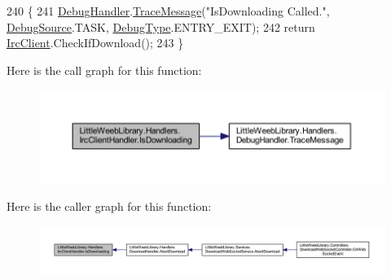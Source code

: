 \begin{DoxyCode}
240         \{
241             \mbox{\hyperlink{class_little_weeb_library_1_1_handlers_1_1_irc_client_handler_ab50ece494948d25db1839f4d6eab038f}{DebugHandler}}.\mbox{\hyperlink{interface_little_weeb_library_1_1_handlers_1_1_i_debug_handler_a2e405bc3492e683cd3702fae125221bc}{TraceMessage}}(\textcolor{stringliteral}{"IsDownloading Called."}, 
      \mbox{\hyperlink{namespace_little_weeb_library_1_1_handlers_a2a6ca0775121c9c503d58aa254d292be}{DebugSource}}.TASK, \mbox{\hyperlink{namespace_little_weeb_library_1_1_handlers_ab66019ed40462876ec4e61bb3ccb0a62}{DebugType}}.ENTRY\_EXIT);
242             \textcolor{keywordflow}{return} \mbox{\hyperlink{class_little_weeb_library_1_1_handlers_1_1_irc_client_handler_a1c78638ea8025b27bb3e604f432ce325}{IrcClient}}.CheckIfDownload();
243         \}
\end{DoxyCode}
Here is the call graph for this function\+:\nopagebreak
\begin{figure}[H]
\begin{center}
\leavevmode
\includegraphics[width=350pt]{class_little_weeb_library_1_1_handlers_1_1_irc_client_handler_a093409b2b1397a6a061e00802546c87b_cgraph}
\end{center}
\end{figure}
Here is the caller graph for this function\+:\nopagebreak
\begin{figure}[H]
\begin{center}
\leavevmode
\includegraphics[width=350pt]{class_little_weeb_library_1_1_handlers_1_1_irc_client_handler_a093409b2b1397a6a061e00802546c87b_icgraph}
\end{center}
\end{figure}
\mbox{\label{class_little_weeb_library_1_1_handlers_1_1_irc_client_handler_a2cc2c26c57a1c94f209ca8641c9e25ef}} 
